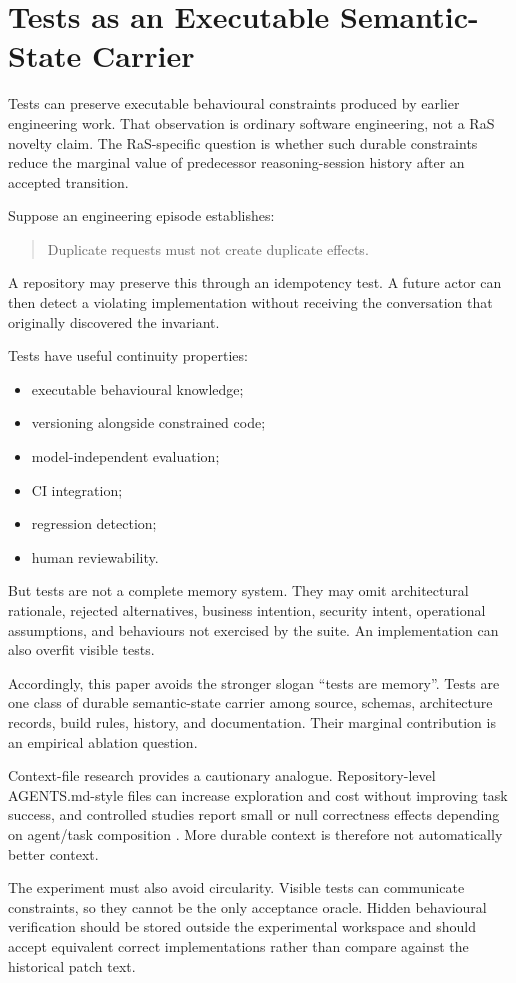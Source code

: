 \section{Tests as an Executable Semantic-State Carrier}
\label{sec:executable-memory}

Tests can preserve executable behavioural constraints produced by earlier engineering work. That observation is ordinary software engineering, not a RaS novelty claim. The RaS-specific question is whether such durable constraints reduce the marginal value of predecessor reasoning-session history after an accepted transition.

Suppose an engineering episode establishes:
\begin{quote}
Duplicate requests must not create duplicate effects.
\end{quote}
A repository may preserve this through an idempotency test. A future actor can then detect a violating implementation without receiving the conversation that originally discovered the invariant.

Tests have useful continuity properties:
\begin{itemize}
    \item executable behavioural knowledge;
    \item versioning alongside constrained code;
    \item model-independent evaluation;
    \item CI integration;
    \item regression detection;
    \item human reviewability.
\end{itemize}

But tests are not a complete memory system. They may omit architectural rationale, rejected alternatives, business intention, security intent, operational assumptions, and behaviours not exercised by the suite. An implementation can also overfit visible tests.

Accordingly, this paper avoids the stronger slogan “tests are memory”. Tests are one class of durable semantic-state carrier among source, schemas, architecture records, build rules, history, and documentation. Their marginal contribution is an empirical ablation question.

Context-file research provides a cautionary analogue. Repository-level AGENTS.md-style files can increase exploration and cost without improving task success, and controlled studies report small or null correctness effects depending on agent/task composition \citep{gloaguen2026agentsmd,khatri2026contextfiles}. More durable context is therefore not automatically better context.

The experiment must also avoid circularity. Visible tests can communicate constraints, so they cannot be the only acceptance oracle. Hidden behavioural verification should be stored outside the experimental workspace and should accept equivalent correct implementations rather than compare against the historical patch text.
